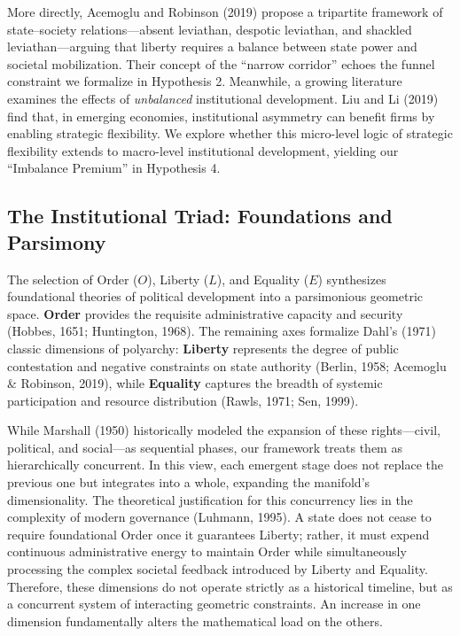 \documentclass[12pt]{article}
\begin{document}
More directly, Acemoglu and Robinson (2019) propose a tripartite framework of state--society relations---absent leviathan, despotic leviathan, and shackled leviathan---arguing that liberty requires a balance between state power and societal mobilization. Their concept of the “narrow corridor” echoes the funnel constraint we formalize in Hypothesis 2. Meanwhile, a growing literature examines the effects of \textit{unbalanced} institutional development. Liu and Li (2019) find that, in emerging economies, institutional asymmetry can benefit firms by enabling strategic flexibility. We explore whether this micro-level logic of strategic flexibility extends to macro-level institutional development, yielding our ``Imbalance Premium'' in Hypothesis 4.

\subsection{The Institutional Triad: Foundations and Parsimony}

The selection of Order ($O$), Liberty ($L$), and Equality ($E$) synthesizes foundational theories of political development into a parsimonious geometric space. \textbf{Order} provides the requisite administrative capacity and security (Hobbes, 1651; Huntington, 1968). The remaining axes formalize Dahl’s (1971) classic dimensions of polyarchy: \textbf{Liberty} represents the degree of public contestation and negative constraints on state authority (Berlin, 1958; Acemoglu \& Robinson, 2019), while \textbf{Equality} captures the breadth of systemic participation and resource distribution (Rawls, 1971; Sen, 1999).

While Marshall (1950) historically modeled the expansion of these rights—civil, political, and social—as sequential phases, our framework treats them as hierarchically concurrent. In this view, each emergent stage does not replace the previous one but integrates into a whole, expanding the manifold's dimensionality. The theoretical justification for this concurrency lies in the complexity of modern governance (Luhmann, 1995). A state does not cease to require foundational Order once it guarantees Liberty; rather, it must expend continuous administrative energy to maintain Order while simultaneously processing the complex societal feedback introduced by Liberty and Equality. Therefore, these dimensions do not operate strictly as a historical timeline, but as a concurrent system of interacting geometric constraints. An increase in one dimension fundamentally alters the mathematical load on the others.
\end{document}
